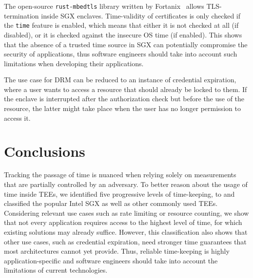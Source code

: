 The open-source \texttt{rust-mbedtls} library written by
Fortanix~\cite{rustMbedtls} allows TLS-termination inside SGX enclaves.
Time-validity of certificates is only checked if the \texttt{time} feature is
enabled, which means that either it is not checked at all (if disabled), or it
is checked against the insecure OS time (if enabled). This shows that the
absence of a trusted time source in SGX can potentially compromise the security
of applications, thus software engineers should take into account such
limitations when developing their applications.

The use case for DRM can be reduced to an instance of credential expiration,
where a user wants to access a resource that should already be locked to them.
If the enclave is interrupted after the authorization check but before the use
of the resource, the latter might take place when the user has no longer
permission to access it.

\section{Conclusions}
Tracking the passage of time is nuanced when relying solely on measurements that
are partially controlled by an adversary. To better reason about the usage of
time inside TEEs, we identified five progressive levels of time-keeping, \Tzero
to \Tfour and classified the popular Intel SGX as well as other commonly used
TEEs. Considering relevant use cases such as rate limiting or resource counting,
we show that not every application requires access to the highest level of time,
for which existing solutions may already suffice. However, this classification
also shows that other use cases, such as credential expiration, need stronger
time guarantees that most architectures cannot yet provide. Thus, reliable
time-keeping is highly application-specific and software engineers should take
into account the limitations of current technologies.

